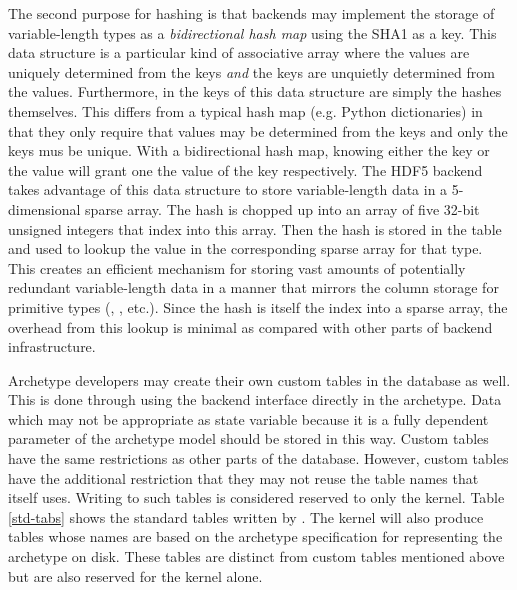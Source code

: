 The second purpose for hashing is that backends may implement the storage 
of variable-length types as a \emph{bidirectional hash map} using the 
\gls{SHA1} as a key.  This data structure is a particular kind of associative array where the values are 
uniquely determined from the keys \emph{and} the keys are unquietly determined from 
the values. Furthermore, in \cyclus the keys of this data structure are simply the 
hashes themselves. This differs from a typical hash map (e.g. Python dictionaries) 
in that they only require that values may be determined from the keys and only the
keys mus be unique.  With a bidirectional hash map, knowing either the key or the value
will grant one the value of the key respectively.  The \gls{HDF5} backend takes advantage 
of this data structure to store variable-length data in a 5-dimensional sparse array.
The hash is chopped up into an array of five 32-bit unsigned integers that 
index into this array. Then the hash is stored in the table and used to lookup 
the value in the corresponding sparse array for that type.  This creates an efficient 
mechanism for storing vast amounts of potentially redundant variable-length data in 
a manner that mirrors the column storage for primitive types (, , 
etc.). Since the hash is itself the index into a sparse array, the overhead from 
this lookup is minimal as compared with other parts of backend infrastructure.

Archetype developers may create their own custom tables in the database as well.
This is done through using the backend interface directly in the archetype. Data 
which may not be appropriate as state variable because it is a fully dependent 
parameter of the archetype model should be stored in this way.  Custom tables 
have the same restrictions as other parts of the database.  However, custom tables
have the additional restriction that they may not reuse the table names that 
\cyclus itself uses. Writing to such tables is considered reserved to only
the kernel. 
Table \ref{std-tabs} shows the standard tables written by \cyclus.
The kernel will also produce tables whose names are based on the 
archetype specification for representing the archetype on disk.  These tables
are distinct from custom tables mentioned above but are also reserved for the 
kernel alone. 

